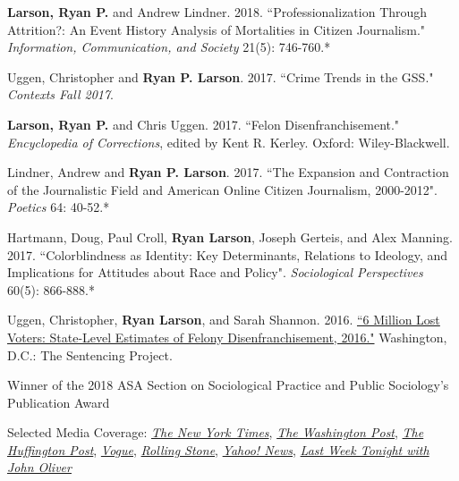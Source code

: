 \documentclass[letterpaper]{article}
\renewenvironment{itemize}{
  \begin{list}{}{
    \setlength{\leftmargin}{1.5em}
  }
}{
  \end{list}
}
\begin{document}
\begin{itemize}
\item \textbf{Larson, Ryan P.} and Andrew Lindner. 2018. ``Professionalization Through Attrition?: An Event History Analysis of Mortalities in Citizen Journalism."  \textit{Information, Communication, and Society} 21(5): 746-760.*

\item Uggen, Christopher and \textbf{Ryan P. Larson}. 2017.  ``Crime Trends in the GSS." \textit{Contexts Fall 2017}.

\item \textbf{Larson, Ryan P.} and Chris Uggen. 2017. ``Felon Disenfranchisement." \textit{Encyclopedia of Corrections}, edited by Kent R. Kerley. Oxford: Wiley-Blackwell.

\item Lindner, Andrew and \textbf{Ryan P. Larson}. 2017. ``The Expansion and Contraction of the Journalistic Field and American Online Citizen Journalism, 2000-2012". \textit{Poetics} 64: 40-52.*

\item Hartmann, Doug, Paul Croll, \textbf{Ryan Larson}, Joseph Gerteis, and  Alex Manning. 2017. ``Colorblindness as Identity:  Key Determinants, Relations to Ideology, and Implications for Attitudes about Race and Policy". \textit{Sociological Perspectives} 60(5): 866-888.*

\item Uggen, Christopher, \textbf{Ryan Larson}, and Sarah Shannon. 2016. \href{http://www.sentencingproject.org/wp-content/uploads/2016/10/6-Million-Lost-Voters.pdf}{``6 Million Lost Voters: State-Level Estimates of Felony Disenfranchisement, 2016."} Washington, D.C.: The Sentencing Project.
\begin{itemize}
\item Winner of the 2018 ASA Section on Sociological Practice and Public Sociology's Publication Award
\item Selected Media Coverage: \href{http://www.nytimes.com/interactive/2016/10/06/us/unequal-effect-of-laws-that-block-felons-from-voting.html?_r=0}{\textit{The New York Times}}, \href{https://www.washingtonpost.com/news/powerpost/wp/2016/10/07/6-million-citizens-including-1-in-13-african-americans-are-blocked-from-voting-because-of-felonies/}{\textit{The Washington Post}}, \href{http://www.huffingtonpost.com/harlan-green/trump-the-terrible-demago_b_12392904.html}{\textit{The Huffington Post}}, \href{http://www.vogue.com/13489654/2016-presidential-election-felony-disenfranchisement/}{\textit{Vogue}}, \href{http://www.rollingstone.com/politics/features/six-million-adults-who-wont-influence-this-election-w443693}{\textit{Rolling Stone}}, \href{https://www.yahoo.com/news/more-6-million-americans-t-vote-election-105300558.html}{\textit{Yahoo! News}}, \href{https://www.youtube.com/watch?time_continue=2&v=NpPyLcQ2vdI}{\textit{Last Week Tonight with John Oliver}}
\end{itemize}


\end{itemize}
\end{document}
